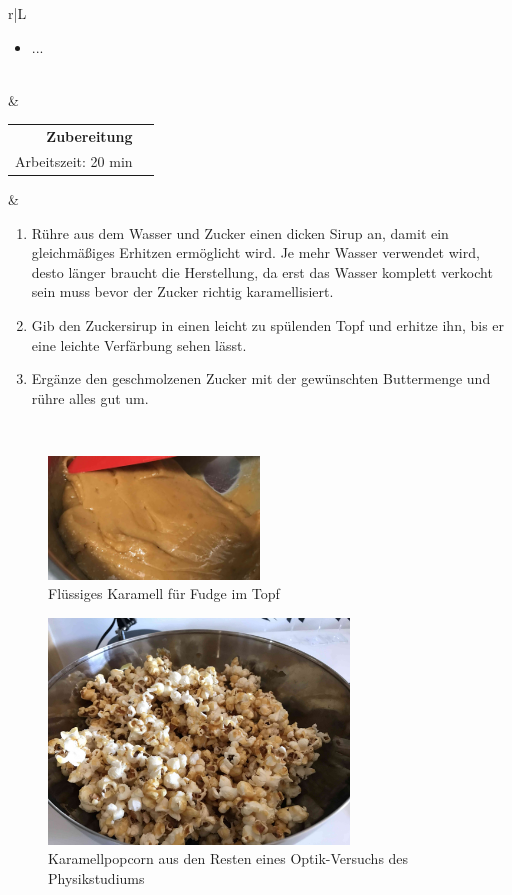\documentclass[a4paper, 12pt]{scrbook} 								%
\numberwithin{equation}{section} 									%
\begin{document}
\begin{tabularx}{\textwidth}{r|L}
\begin{itemize}[]
										\item ...
									\end{itemize}	\\
								&	\\	
		\begin{tabular}[t]{rr}
			\textbf{Zubereitung}	\\
			Arbeitszeit: 20 min	\\
		\end{tabular}			&	\begin{enumerate}[]
										\item Rühre aus dem Wasser und Zucker einen dicken Sirup an, damit ein gleichmäßiges Erhitzen ermöglicht wird. Je mehr Wasser verwendet wird, desto länger braucht die Herstellung, da erst das Wasser komplett verkocht sein muss bevor der Zucker richtig karamellisiert. 
										\item Gib den Zuckersirup in einen leicht zu spülenden Topf und erhitze ihn, bis er eine leichte Verfärbung sehen lässt.
										\item Ergänze den geschmolzenen Zucker mit der gewünschten Buttermenge und rühre alles gut um.
									\end{enumerate}	\\
	\end{tabularx}


	\begin{figure}[h]
		\centering
		\includegraphics[width = 0.5\textwidth]{media/karamell_fudge.JPG}
		\caption{Flüssiges Karamell für Fudge im Topf}
	\end{figure}

	\begin{figure}[h]
		\centering
		\includegraphics[height = 6cm]{media/popcorn.jpg}
		\caption{Karamellpopcorn aus den Resten eines Optik-Versuchs des Physikstudiums}
	\end{figure}
\end{document}

